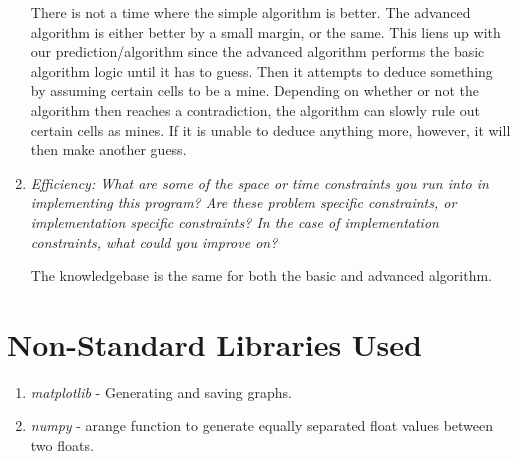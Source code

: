 \documentclass[12pt, twoside]{article}
\begin{document}
\begin{enumerate}[itemsep=2mm,parsep=4mm]
        There is not a time where the simple algorithm is better. The advanced algorithm is either better by a small margin, or the same. This liens up with our prediction/algorithm since the advanced algorithm performs the basic algorithm logic until it has to guess. Then it attempts to deduce something by assuming certain cells to be a mine. Depending on whether or not the algorithm then reaches a contradiction, the algorithm can slowly rule out certain cells as mines. If it is unable to deduce anything more, however, it will then make another guess.

        \vfill
        \pagebreak

    \item 
        \textit{Efficiency: What are some of the space or time constraints you run into in implementing this program? Are these problem specific constraints, or implementation specific constraints? In the case of implementation constraints, what could you improve on?}

        The knowledgebase is the same for both the basic and advanced algorithm. 

\end{enumerate}
 
\vfill
\pagebreak
\section{Non-Standard Libraries Used}

\begin{enumerate}
    \item
        \textit{matplotlib} - Generating and saving graphs.
    \item
        \textit{numpy} - arange function to generate equally separated float values between two floats.
\end{enumerate}
 
\end{document}
